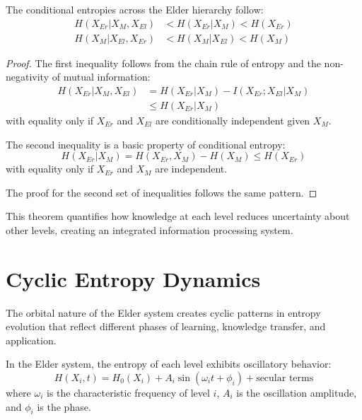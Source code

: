 \begin{theorem}
The conditional entropies across the Elder hierarchy follow:
\begin{align}
H(X_{Er} | X_M, X_{El}) &< H(X_{Er} | X_M) < H(X_{Er}) \\
H(X_M | X_{El}, X_{Er}) &< H(X_M | X_{El}) < H(X_M)
\end{align}
\end{theorem}

\begin{proof}
The first inequality follows from the chain rule of entropy and the non-negativity of mutual information:
\begin{align}
H(X_{Er} | X_M, X_{El}) &= H(X_{Er} | X_M) - I(X_{Er}; X_{El} | X_M) \\
&\leq H(X_{Er} | X_M)
\end{align}
with equality only if $X_{Er}$ and $X_{El}$ are conditionally independent given $X_M$.

The second inequality is a basic property of conditional entropy:
\begin{equation}
H(X_{Er} | X_M) = H(X_{Er}, X_M) - H(X_M) \leq H(X_{Er})
\end{equation}
with equality only if $X_{Er}$ and $X_M$ are independent.

The proof for the second set of inequalities follows the same pattern.
\end{proof}

This theorem quantifies how knowledge at each level reduces uncertainty about other levels, creating an integrated information processing system.

\section{Cyclic Entropy Dynamics}

The orbital nature of the Elder system creates cyclic patterns in entropy evolution that reflect different phases of learning, knowledge transfer, and application.

\begin{theorem}
In the Elder system, the entropy of each level exhibits oscillatory behavior:
\begin{equation}
H(X_i, t) = H_0(X_i) + A_i \sin(\omega_i t + \phi_i) + \text{secular terms}
\end{equation}
where $\omega_i$ is the characteristic frequency of level $i$, $A_i$ is the oscillation amplitude, and $\phi_i$ is the phase.
\end{theorem}

